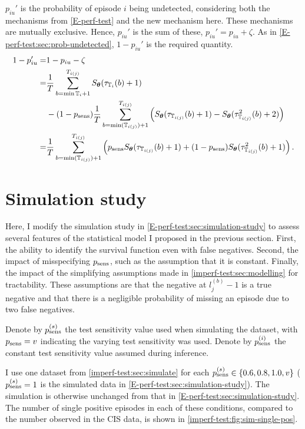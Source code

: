 \documentclass[thesis.tex]{subfiles}
\begin{document}
$p_{iu}'$ is the probability of episode $i$ being undetected, considering both the mechanisms from \cref{E-perf-test} and the new mechanism here.
These mechanisms are mutually exclusive.
Hence, $p_{iu}'$ is the sum of these, $p_{iu}' = p_{iu} + \zeta$.
As in \cref{E-perf-test:sec:prob-undetected}, $1 - p_{iu}'$ is the required quantity.
\begin{align}
1 - p_{iu}'
=& 1 - p_{iu} - \zeta \\
=& \frac{1}{T} \sum_{b = \min \mathbb{T}_{i} + 1}^{T_{i(j)}} S_{\bm{\theta}}(\tau_{\mathbb{T}_{i}}(b) + 1) \\
&- (1 - p_\text{sens})\frac{1}{T} \sum_{b=\min(\mathbb{T}_{i(j)}) + 1}^{T_{i(j)}} \left( S_{\bm{\theta}}(\tau_{\mathbb{T}_{i(j)}}(b) + 1) - S_{\bm{\theta}}(\tau^2_{\mathbb{T}_{i(j)}}(b) + 2) \right) \\
=& \frac{1}{T} \sum_{b=\min(\mathbb{T}_{i(j)}) + 1}^{T_{i(j)}} \left( p_\text{sens} S_{\bm{\theta}}(\tau_{\mathbb{T}_{i(j)}}(b) + 1) + (1 - p_\text{sens}) S_{\bm{\theta}}(\tau^2_{\mathbb{T}_{i(j)}}(b) + 1)\right).
\label{imperf-test:eq:pit-prime}
\end{align}

\section{Simulation study} \label{imperf-test:sec:sim-study-results}

Here, I modify the simulation study in \cref{E-perf-test:sec:simulation-study} to assess several features of the statistical model I proposed in the previous section.
First, the ability to identify the survival function even with false negatives.
Second, the impact of misspecifying $p_\text{sens}$, such as the assumption that it is constant.
Finally, the impact of the simplifying assumptions made in \cref{imperf-test:sec:modelling} for tractability.
These assumptions are that the negative at $l^{(b)}_j - 1$ is a true negative and that there is a negligible probability of missing an episode due to two false negatives.

Denote by $p_\text{sens}^{(s)}$ the test sensitivity value used when simulating the dataset, with $p_\text{sens} = v$ indicating the varying test sensitivity was used.
Denote by $p_\text{sens}^{(i)}$ the constant test sensitivity value assumed during inference.

I use one dataset from \cref{imperf-test:sec:simulate} for each $p_\text{sens}^{(s)} \in \{ 0.6, 0.8, 1.0, v \}$ ($p_\text{sens}^{(s)} = 1$ is the simulated data in \cref{E-perf-test:sec:simulation-study}).
The simulation is otherwise unchanged from that in \cref{E-perf-test:sec:simulation-study}.
The number of single positive episodes in each of these conditions, compared to the number observed in the CIS data, is shown in \cref{imperf-test:fig:sim-single-pos}.
\end{document}
